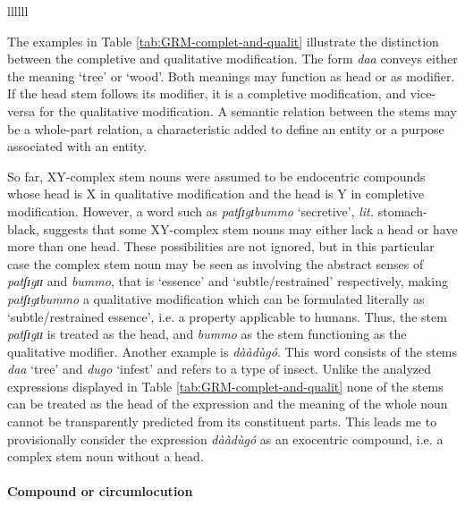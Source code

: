 \begin{exe}
\begin{exe}
\begin{exe}
{\begin{exe}
\begin{exe}
\begin{exe}
\begin{exe}
\begin{table}[htb!]
\begin{Itabular}{llllll}
\lspbottomrule
\end{Itabular} 
\end{table} 


The examples in Table \ref{tab:GRM-complet-and-qualit} illustrate the
distinction between the completive and qualitative modification. The form {\it 
daa}  conveys either the meaning `tree' or `wood'. Both meanings may function as
head or as modifier.  If the head stem follows its modifier, it is a completive
modification, and vice-versa for the qualitative modification. A semantic
relation between the stems may  be a whole-part relation, a characteristic added
to define an entity or a purpose  associated with an entity. 

So far,   XY-complex stem nouns were assumed to be  endocentric compounds whose
head is X in qualitative modification and the head is Y in completive
modification.  However, a word such as {\it patʃɪgɪbummo} `secretive', {\it 
lit.}
stomach-black, suggests that some XY-complex stem nouns may  either lack a head
or have more than one head. These possibilities are not ignored, but in this
particular case the complex stem noun may be seen as involving  the abstract
senses of {\it patʃɪgɪɪ} and {\it bummo}, that is  `essence' and 
`subtle/restrained' respectively, making {\it patʃɪgɪbummo} a qualitative
modification  which can be formulated literally as `subtle/restrained essence',
i.e.   a property applicable to humans. Thus, the stem {\it patʃɪgɪɪ} is treated
as the head, and {\it bummo} as the stem functioning as the qualitative 
modifier.
Another example is {\it dààdùgó}. This word consists of the stems {\it daa}
`tree' and  {\it dugo} `infest'   and refers to a type   of insect. Unlike the
analyzed expressions displayed in  Table \ref{tab:GRM-complet-and-qualit}  none
of the stems can be treated as the head of the expression and the meaning of the
whole noun cannot be transparently  predicted from its constituent parts. This
leads me to provisionally consider the expression {\it dààdùgó}  as an
exocentric compound, i.e. a complex stem noun without a head.


 
\paragraph{Compound or circumlocution}
\label{sec:GRM-comp-vs-circum}


\end{exe}
\end{exe}
\end{exe}
\end{exe}}
\end{exe}
\end{exe}
\end{exe}
